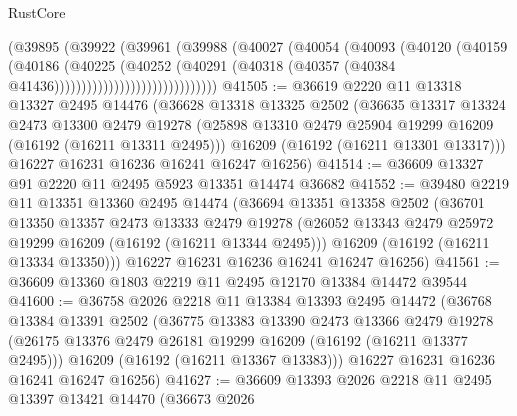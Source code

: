 \begin{lexlean}{RustCore}
\begin{coremodule}
                                (@39895
                                  (@39922
                                    (@39961
                                      (@39988
                                        (@40027
                                          (@40054
                                            (@40093
                                              (@40120
                                                (@40159
                                                  (@40186
                                                    (@40225
                                                      (@40252
                                                        (@40291
                                                          (@40318
                                                            (@40357
                                                              (@40384
                                                                @41436))))))))))))))))))))))))))))))
@41505 := @36619
    @2220
    @11
    @13318
    @13327
    @2495
    @14476
    (@36628
      @13318
      @13325
      @2502
      (@36635
        @13317
        @13324
        @2473
        @13300
        @2479
        @19278
        (@25898 @13310 @2479 @25904 @19299 @16209 (@16192 (@16211 @13311 @2495)))
        @16209
        (@16192 (@16211 @13301 @13317)))
      @16227
      @16231
      @16236
      @16241
      @16247
      @16256)
@41514 := @36609 @13327 @91 @2220 @11 @2495 @5923 @13351 @14474 @36682
@41552 := @39480
    @2219
    @11
    @13351
    @13360
    @2495
    @14474
    (@36694
      @13351
      @13358
      @2502
      (@36701
        @13350
        @13357
        @2473
        @13333
        @2479
        @19278
        (@26052 @13343 @2479 @25972 @19299 @16209 (@16192 (@16211 @13344 @2495)))
        @16209
        (@16192 (@16211 @13334 @13350)))
      @16227
      @16231
      @16236
      @16241
      @16247
      @16256)
@41561 := @36609 @13360 @1803 @2219 @11 @2495 @12170 @13384 @14472 @39544
@41600 := @36758
    @2026
    @2218
    @11
    @13384
    @13393
    @2495
    @14472
    (@36768
      @13384
      @13391
      @2502
      (@36775
        @13383
        @13390
        @2473
        @13366
        @2479
        @19278
        (@26175 @13376 @2479 @26181 @19299 @16209 (@16192 (@16211 @13377 @2495)))
        @16209
        (@16192 (@16211 @13367 @13383)))
      @16227
      @16231
      @16236
      @16241
      @16247
      @16256)
@41627 := @36609
    @13393
    @2026
    @2218
    @11
    @2495
    @13397
    @13421
    @14470
    (@36673
      @2026

\end{coremodule}
\end{lexlean}
